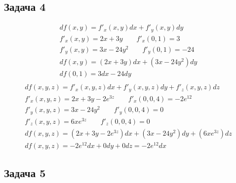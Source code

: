 \documentclass[a4paper,fleqn,12pt]{article}
\theoremstyle{definition}
\begin{document}
\subsection*{Задача 4}
\begin{gather*}
df(x,y) = f'_x(x,y)dx + f'_y(x,y)dy\\
f'_x(x,y) = 2x + 3y \qquad f'_x(0,1) = 3\\
f'_y(x,y) = 3x - 24y^2 \qquad f'_y(0,1) = -24\\
df(x,y) = (2x + 3y)dx + (3x - 24y^2)dy\\
df(0,1) = 3dx - 24dy\\
\end{gather*}
\begin{gather*}
df(x,y,z) = f'_x(x,y,z)dx + f'_y(x,y,z)dy +  f'_z(x,y,z)dz\\
f'_x(x,y,z) = 2x + 3y - 2e^{3z} \qquad f'_x(0,0,4) = - 2e^{12}\\
f'_y(x,y,z) = 3x - 24y^2 \qquad f'_y(0,0,4) = 0\\
f'_z(x,y,z) = 6xe^{3z} \qquad f'_z(0,0,4) = 0\\
df(x,y,z) =(2x + 3y - 2e^{3z})dx + (3x - 24y^2)dy +  (6xe^{3z})dz\\
df(x,y,z) = - 2e^{12}dx + 0dy + 0dz = - 2e^{12}dx
\end{gather*}

\subsection*{Задача 5}
\end{document}
